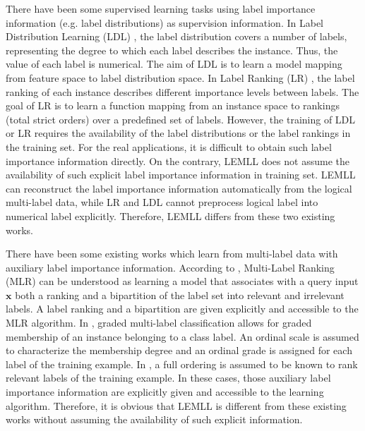 \documentclass[conference]{IEEEtran}
\begin{document}
There have been some supervised learning tasks using label importance information (e.g. label distributions) as supervision information. In Label Distribution Learning (LDL) \cite{geng2016label}, the label distribution covers a number of labels, representing the degree to which each label describes the instance. Thus, the value of each label is numerical. The aim of LDL is to learn a model mapping from feature space to label distribution space. In Label Ranking (LR) \cite{furnkranz2003pairwise,dekel2004log,hullermeier2008label}, the label ranking of each instance describes different importance levels between labels. The goal of LR is to learn a function mapping from an instance space to rankings (total strict orders) over a predefined set of labels. However, the training of LDL or LR requires the availability of the label distributions or the label rankings in the training set. For the real applications, it is difficult to obtain such label importance information directly. On the contrary, LEMLL does not assume the availability of such explicit label importance information in training set. LEMLL can reconstruct the label importance information automatically from the logical multi-label data, while LR and LDL cannot preprocess logical label into numerical label explicitly. Therefore, LEMLL differs from these two existing works.

There have been some existing works which learn from multi-label data with auxiliary label importance information. According to \cite{brinker2007case}, Multi-Label Ranking (MLR) can be understood as learning a model that associates with a query input $\bm{x}$ both a ranking and a bipartition of the label set into relevant and irrelevant labels. A label ranking and a bipartition are given explicitly and accessible to the MLR algorithm. In \cite{cheng2010graded}, graded multi-label classification allows for graded membership of an instance belonging to a class label. An ordinal scale is assumed to characterize the membership degree and an ordinal grade is assigned for each label of the training example. In \cite{xu2013multi}, a full ordering is assumed to be known to rank relevant labels of the training example. In these cases, those auxiliary label importance information are explicitly given and accessible to the learning algorithm. Therefore, it is obvious that LEMLL is different from these existing works without assuming the availability of such explicit information.
\end{document}
